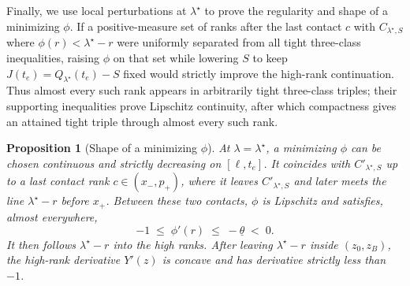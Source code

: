 \documentclass[11pt]{article}
\numberwithin{equation}{section}
\theoremstyle{plain}
\newtheorem{proposition}[theorem]{Proposition}
\theoremstyle{definition}
\newcommand{\1}{\mathbf{1}}
\begin{document}
Finally, we use local perturbations at $\lambda^\star$ to prove the regularity and shape of a minimizing $\phi$. If a positive-measure set of ranks after the last contact $c$ with $C_{\lambda^\star, S}$ where $\phi(r) < \lambda^\star - r$ were uniformly separated from all tight three-class inequalities, raising $\phi$ on that set while lowering $S$ to keep $J(t_e) = Q_{\lambda^\star}(t_e) - S$ fixed would strictly improve the high-rank continuation. Thus almost every such rank appears in arbitrarily tight three-class triples; their supporting inequalities prove Lipschitz continuity, after which compactness gives an attained tight triple through almost every such rank.

\begin{proposition}[Shape of a minimizing $\phi$]
\label{prop:shape}
At $\lambda = \lambda^\star$, a minimizing $\phi$ can be chosen continuous and strictly decreasing on $[\ell, t_e]$. It coincides with $C'_{\lambda^\star, S}$ up to a last contact rank $c \in (x_-, p_+)$, where it leaves $C'_{\lambda^\star, S}$ and later meets the line $\lambda^\star - r$ before $x_+$. Between these two contacts, $\phi$ is Lipschitz and satisfies, almost everywhere,
\[
  -1 \;\le\; \phi'(r) \;\le\; -\underline{\theta} \;<\; 0.
\]
It then follows $\lambda^\star - r$ into the high ranks. After leaving $\lambda^\star - r$ inside $(z_0, z_B)$, the high-rank derivative $Y'(z)$ is concave and has derivative strictly less than $-1$.
\end{proposition}
\end{document}
